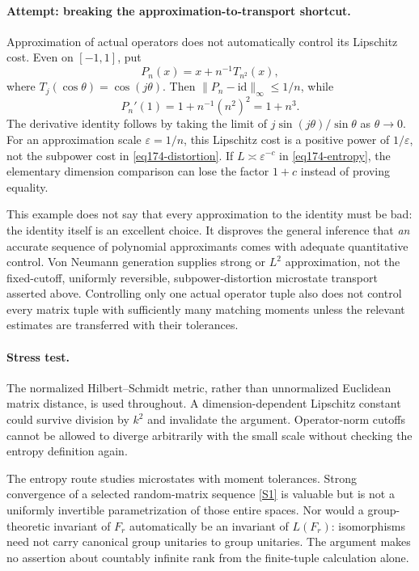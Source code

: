 \documentclass[11pt,a4paper]{article}
\newcommand{\eps}{\varepsilon}
\newcommand{\sref}[2]{\hyperlink{source:#1:#2}{[S#2]}}
\numberwithin{equation}{section}
\begin{document}
\paragraph{Attempt: breaking the approximation-to-transport shortcut.}
Approximation of actual operators does not automatically control its
Lipschitz cost. Even on $[-1,1]$, put
\[
 P_n(x)=x+n^{-1}T_{n^2}(x),
\]
where $T_j(\cos\theta)=\cos(j\theta)$. Then
$\|P_n-\mathrm{id}\|_\infty\le1/n$, while
\[
 P_n'(1)=1+n^{-1}(n^2)^2=1+n^3.
\]
The derivative identity follows by taking the limit of
$j\sin(j\theta)/\sin\theta$ as $\theta\to0$.
For an approximation scale $\eps=1/n$, this Lipschitz cost is a positive
power of $1/\eps$, not the subpower cost in \eqref{eq174-distortion}.
If $L\asymp\eps^{-c}$ in \eqref{eq174-entropy}, the elementary dimension
comparison can lose the factor $1+c$ instead of proving equality.

This example does not say that every approximation to the identity must be
bad: the identity itself is an excellent choice. It disproves the general
inference that \emph{an} accurate sequence of polynomial approximants comes
with adequate quantitative control. Von Neumann generation supplies strong
or $L^2$ approximation, not the fixed-cutoff, uniformly reversible,
subpower-distortion microstate transport asserted above. Controlling only
one actual operator tuple also does not control every matrix tuple with
sufficiently many matching moments unless the relevant estimates are
transferred with their tolerances.

\paragraph{Stress test.}
The normalized Hilbert--Schmidt metric, rather than unnormalized Euclidean
matrix distance, is used throughout. A dimension-dependent Lipschitz
constant could survive division by $k^2$ and invalidate the argument.
Operator-norm cutoffs cannot be allowed to diverge arbitrarily with the
small scale without checking the entropy definition again.

The entropy route studies microstates with moment tolerances. Strong
convergence of a selected random-matrix sequence \sref{174}{1} is valuable
but is not a uniformly invertible parametrization of those entire spaces.
Nor would a group-theoretic invariant of $F_r$ automatically be an invariant
of $L(F_r)$: isomorphisms need not carry canonical group unitaries to group
unitaries. The argument makes no assertion about countably infinite rank
from the finite-tuple calculation alone.
\end{document}
